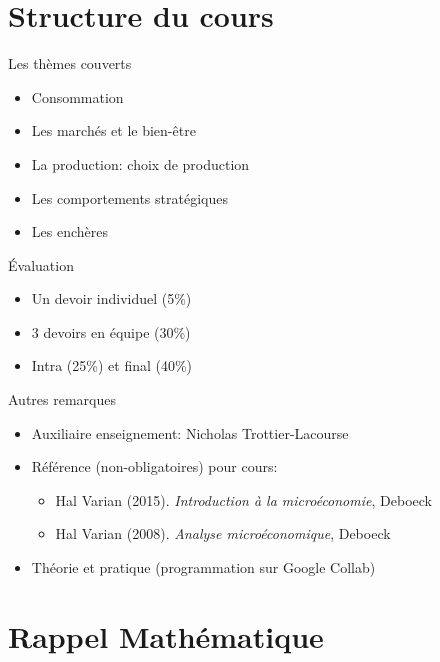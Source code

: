 \documentclass[handout]{beamer}
\begin{document}
\section{Structure du cours}

\begin{frame}{Les thèmes couverts}
  \begin{itemize}
  \item<1-> Consommation
  \item<2-> Les marchés et le bien-être
  \item<3-> La production: choix de production
  \item<4-> Les comportements stratégiques
  \item<5-> Les enchères
  \end{itemize}
  
\end{frame}

\begin{frame}{Évaluation}

\begin{itemize}
\item Un devoir individuel (5\%)
\item 3 devoirs en équipe (30\%)
\item Intra (25\%) et final (40\%)
\end{itemize}

\end{frame}

\begin{frame}{Autres remarques}

\begin{itemize}
\item Auxiliaire enseignement: Nicholas Trottier-Lacourse
\item Référence (non-obligatoires) pour cours:
\begin{itemize}
    \item Hal Varian (2015). \textit{Introduction à la microéconomie}, Deboeck
    \item Hal Varian (2008). \textit{Analyse microéconomique}, Deboeck
\end{itemize}
\item Théorie et pratique (programmation sur Google Collab)
\end{itemize}

\end{frame}

\section{Rappel Mathématique}
\end{document}

